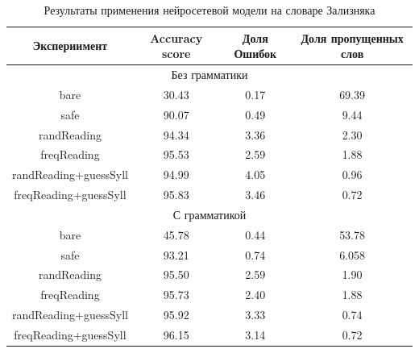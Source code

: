 \documentclass[14pt, a4paper, russian]{extreport}
\begin{document}
\begin{table}[H]
		\caption{Результаты применения нейросетевой модели на словаре Зализняка}
	
	\begin{small}
		\begin{center}
			\begin{tabular}{|c|c|c|c|}
				\hline
				    Экспериимент      & Accuracy score & Доля Ошибок & Доля пропущенных слов \\ \hline
				\multicolumn{4}{|c|}{Без грамматики}                                         \\ \hline
				        bare          &     30.43      &    0.17     &         69.39         \\ \hline
				        safe          &     90.07      &    0.49     &         9.44          \\ \hline
				     randReading      &     94.34      &    3.36     &         2.30          \\ \hline
				     freqReading      &     95.53      &    2.59     &         1.88          \\ \hline
				randReading+guessSyll &     94.99      &    4.05     &         0.96          \\ \hline
				freqReading+guessSyll &     95.83      &    3.46     &         0.72          \\ \hline
				\multicolumn{4}{|c|}{С грамматикой}                                          \\ \hline
				        bare          &     45.78      &    0.44     &         53.78         \\ \hline
				        safe          &     93.21      &    0.74     &         6.058         \\ \hline
				     randReading      &     95.50      &    2.59     &         1.90          \\ \hline
				     freqReading      &     95.73      &    2.40     &         1.88          \\ \hline
				randReading+guessSyll &     95.92      &    3.33     &         0.74          \\ \hline
				freqReading+guessSyll &     96.15      &    3.14     &         0.72          \\ \hline
			\end{tabular}
		\end{center}
	\end{small}
	\label{table:base_text}
\end{table}
\end{document}
